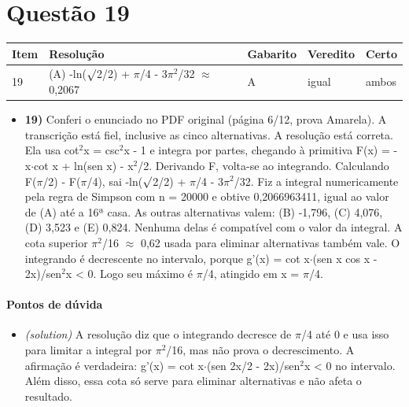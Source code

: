\documentclass{article}%
\begin{document}
\section*{Questão 19}%
\begin{longtable}{@{}p{} p{} p{} p{} p{}@{}}\toprule Item & Resolução & Gabarito & Veredito & Certo \\ \midrule
19 & (A) -ln($\surd$2/2) + $\pi$/4 - 3$\pi$$^2$/32 $\approx$ 0,2067 & A & igual & ambos \\
\bottomrule\end{longtable}%
\begin{itemize}%
\item%
\textbf{19)} Conferi o enunciado no PDF original (página 6/12, prova Amarela). A transcrição está fiel, inclusive as cinco alternativas. A resolução está correta. Ela usa cot$^2$x = csc$^2$x - 1 e integra por partes, chegando à primitiva F(x) = -x$\cdot$cot x + ln(sen x) - x$^2$/2. Derivando F, volta{-}se ao integrando. Calculando F($\pi$/2) - F($\pi$/4), sai -ln($\surd$2/2) + $\pi$/4 - 3$\pi$$^2$/32. Fiz a integral numericamente pela regra de Simpson com n = 20000 e obtive 0,2066963411, igual ao valor de (A) até a 16ª casa. As outras alternativas valem: (B) -1,796, (C) 4,076, (D) 3,523 e (E) 0,824. Nenhuma delas é compatível com o valor da integral. A cota superior $\pi$$^2$/16 $\approx$ 0,62 usada para eliminar alternativas também vale. O integrando é decrescente no intervalo, porque g'(x) = cot x$\cdot$(sen x cos x - 2x)/sen$^2$x < 0. Logo seu máximo é $\pi$/4, atingido em x = $\pi$/4.%
\end{itemize}%
\paragraph{Pontos de dúvida}%
\begin{itemize}%
\item%
\textit{(solution)} A resolução diz que o integrando decresce de $\pi$/4 até 0 e usa isso para limitar a integral por $\pi$$^2$/16, mas não prova o decrescimento. A afirmação é verdadeira: g'(x) = cot x$\cdot$(sen 2x/2 - 2x)/sen$^2$x < 0 no intervalo. Além disso, essa cota só serve para eliminar alternativas e não afeta o resultado.%
\end{itemize}%
\end{document}
